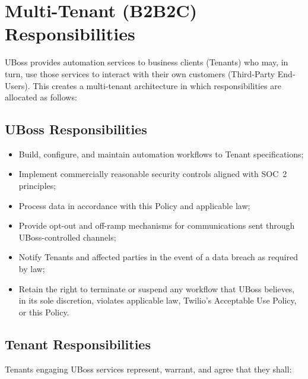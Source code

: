 \documentclass[11pt, letterpaper]{article}
\begin{document}
\section{Multi-Tenant (B2B2C) Responsibilities}

UBoss provides automation services to business clients (Tenants) who may, in turn, use
those services to interact with their own customers (Third-Party End-Users). This
creates a multi-tenant architecture in which responsibilities are allocated as follows:

\subsection{UBoss Responsibilities}

\begin{itemize}
    \item Build, configure, and maintain automation workflows to Tenant specifications;
    \item Implement commercially reasonable security controls aligned with SOC~2
          principles;
    \item Process data in accordance with this Policy and applicable law;
    \item Provide opt-out and off-ramp mechanisms for communications sent through
          UBoss-controlled channels;
    \item Notify Tenants and affected parties in the event of a data breach as required
          by law;
    \item Retain the right to terminate or suspend any workflow that UBoss believes, in
          its sole discretion, violates applicable law, Twilio's Acceptable Use Policy,
          or this Policy.
\end{itemize}

\subsection{Tenant Responsibilities}

Tenants engaging UBoss services represent, warrant, and agree that they shall:
\end{document}
